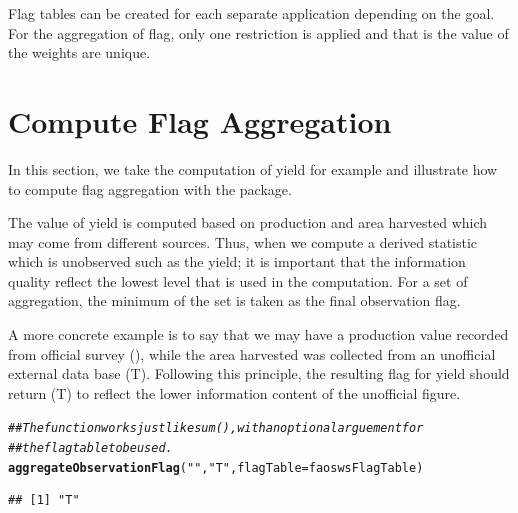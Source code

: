 \documentclass[nojss]{jss}\usepackage[]{graphicx}\usepackage[]{color}
\makeatletter
\newcommand{\hlstr}[1]{\textcolor[rgb]{0.192,0.494,0.8}{#1}}%
\newcommand{\hlcom}[1]{\textcolor[rgb]{0.678,0.584,0.686}{\textit{#1}}}%
\newcommand{\hlstd}[1]{\textcolor[rgb]{0.345,0.345,0.345}{#1}}%
\newcommand{\hlkwc}[1]{\textcolor[rgb]{0.333,0.667,0.333}{#1}}%
\newcommand{\hlkwd}[1]{\textcolor[rgb]{0.737,0.353,0.396}{\textbf{#1}}}%
\newenvironment{kframe}{%
 \def\at@end@of@kframe{}%
 \ifinner\ifhmode%
  \def\at@end@of@kframe{\end{minipage}}%
  \begin{minipage}{\columnwidth}%
 \fi\fi%
 \def\FrameCommand##1{\hskip\@totalleftmargin \hskip-\fboxsep
 \colorbox{shadecolor}{##1}\hskip-\fboxsep
     \hskip-\linewidth \hskip-\@totalleftmargin \hskip\columnwidth}%
 \MakeFramed {\advance\hsize-\width
   \@totalleftmargin\z@ \linewidth\hsize
   \@setminipage}}%
 {\par\unskip\endMakeFramed%
 \at@end@of@kframe}
\newenvironment{knitrout}{}{} %
\makeatother
\begin{document}
Flag tables can be created for each separate application depending on
the goal. For the aggregation of flag, only one restriction is applied
and that is the value of the weights are unique.


\section{Compute Flag Aggregation}

In this section, we take the computation of yield for example and
illustrate how to compute flag aggregation with the package. 

The value of yield is computed based on production and area harvested
which may come from different sources. Thus, when we compute a derived
statistic which is unobserved such as the yield; it is important that
the information quality reflect the lowest level that is used in the
computation. For a set of aggregation, the minimum of the set is taken
as the final observation flag.

A more concrete example is to say that we may have a production value
recorded from official survey (), while the area harvested was
collected from an unofficial external data base (T). Following this
principle, the resulting flag for yield should return (T) to reflect
the lower information content of the unofficial figure.


\begin{knitrout}
\color{fgcolor}\begin{kframe}
\begin{alltt}
\hlcom{## The function works just like sum(), with an optional arguement for}
\hlcom{## the flag table to be used.}
\hlkwd{aggregateObservationFlag}\hlstd{(}\hlstr{""}\hlstd{,} \hlstr{"T"}\hlstd{,} \hlkwc{flagTable} \hlstd{= faoswsFlagTable)}
\end{alltt}
\begin{verbatim}
## [1] "T"
\end{verbatim}
\end{kframe}
\end{knitrout}
\end{document}
